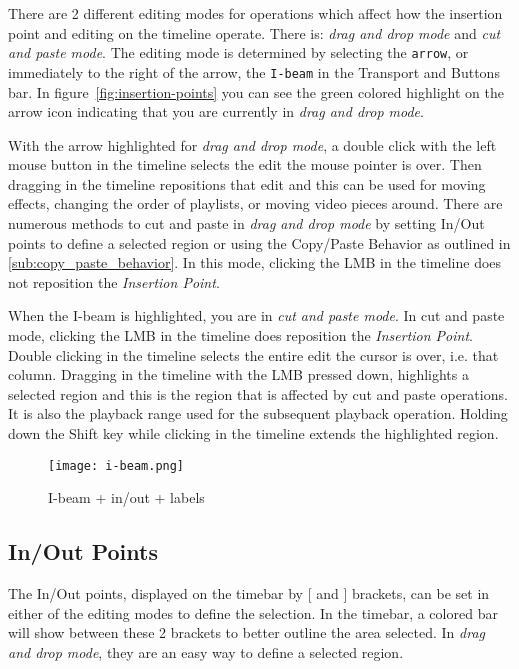 There are 2 different editing modes for operations which affect how the insertion point and editing
on the timeline operate.  
There is:  \emph{drag and drop mode} and \emph{cut and paste mode}. 
The editing mode is determined by selecting the \texttt{arrow}, or immediately to the right of the arrow,
the \texttt{I-beam} in the Transport and Buttons bar. In figure~\ref{fig:insertion-points} you can see
the green colored highlight on the arrow icon indicating that you are currently in 
\emph{drag and drop mode}.

With the arrow highlighted for \emph{drag and drop mode}, a double click with the left mouse button in the timeline selects the edit the mouse pointer is over. 
Then dragging in the timeline repositions that edit and this can be used for moving effects,
changing the order of playlists, or moving video pieces around. 
There are numerous methods to cut and paste in \emph{drag and drop mode} by setting In/Out points to define
a selected region or using the Copy/Paste Behavior as outlined in \ref{sub:copy_paste_behavior}. 
In this mode, clicking the LMB in the timeline does not reposition the \textit{Insertion Point}. 

When the I-beam is highlighted, you are in \emph{cut and paste mode}.
In cut and paste mode, clicking the LMB in the timeline does reposition the \textit{Insertion Point}. 
Double clicking in the timeline selects the entire edit the cursor is over, i.e. that column. 
Dragging in the timeline with the LMB pressed down, highlights a selected region and this is the region that is affected by cut
and paste operations.  It is also the playback range used for the subsequent playback operation. 
Holding down the Shift key while clicking in the timeline extends the highlighted region.

\begin{figure}[htpb]
    \centering
    \texttt{[image: i-beam.png]}
    \caption{I-beam + in/out  +  labels}
    \label{fig:i-beam}
\end{figure}

\subsection{In/Out Points}%
\label{sub:in_out_points}

The In/Out points, displayed on the timebar by [ and ] brackets,  can be set in either of the editing modes to define the selection.
In the timebar, a colored bar will show between these 2 brackets to better outline the area selected.
In \emph{drag and drop mode}, they are an easy way to define a selected region.

